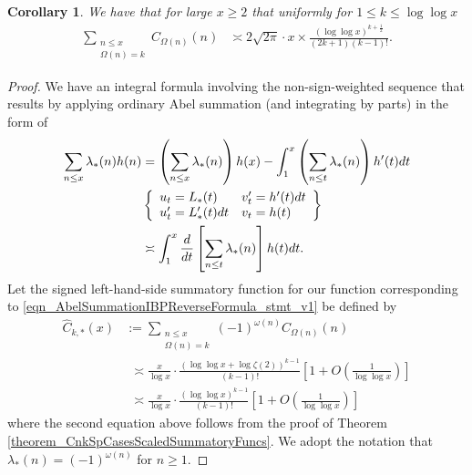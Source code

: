 \documentclass[11pt,reqno,a4letter]{article}
\numberwithin{figure}{section}
\numberwithin{table}{section}
\theoremstyle{plain}
\newtheorem{cor}[theorem]{Corollary}
\numberwithin{theorem}{section}
\theoremstyle{definition}
\begin{document}
\begin{cor} 
\label{cor_SummatoryFuncsOfUnsignedSeqs_v2} 
We have that for large $x \geq 2$ that uniformly for $1 \leq k \leq \log\log x$ 
\begin{align*} 
\sum_{\substack{n \leq x \\ \Omega(n) = k}} C_{\Omega(n)}(n) & \asymp 
     2\sqrt{2\pi} \cdot x \times 
     \frac{(\log\log x)^{k+\frac{1}{2}}}{(2k+1)(k-1)!}. 
\end{align*} 
\end{cor} 
\begin{proof} 
We have an integral formula involving the non-sign-weighted 
sequence that results by 
applying ordinary Abel summation (and integrating by parts) in the form of 
\begin{align} 
\label{eqn_AbelSummationIBPReverseFormula_stmt_v1} 
\sum_{n \leq x} \lambda_{\ast}(n) h(n) & = \left(\sum_{n \leq x} \lambda_{\ast}(n)\right) h(x) - 
     \int_{1}^{x} \left(\sum_{n \leq t} \lambda_{\ast}(n)\right) h^{\prime}(t) dt \\ 
\notag 
     & \left\{\begin{array}{ll} 
     u_t = L_{\ast}(t) & v_t^{\prime} = h^{\prime}(t) dt \\ 
     u_t^{\prime} = L_{\ast}^{\prime}(t) dt & v_t = h(t) 
     \end{array} 
     \right\} \\ 
     & \asymp 
     \int_1^{x} \frac{d}{dt}\left[\sum_{n \leq t} \lambda_{\ast}(n)\right] h(t) dt. 
\end{align} 
Let the signed left-hand-side summatory function for our function 
corresponding to \eqref{eqn_AbelSummationIBPReverseFormula_stmt_v1} be defined by 
\begin{align*} 
\widehat{C}_{k,\ast}(x) & := \sum_{\substack{n \leq x \\ \Omega(n)=k}} 
     (-1)^{\omega(n)} C_{\Omega(n)}(n) \\ 
     & \phantom{:} \asymp  
     \frac{x}{\log x} \cdot \frac{(\log\log x + \log\zeta(2))^{k-1}}{(k-1)!} \left[ 
     1 + O\left(\frac{1}{\log\log x}\right)\right] \\ 
     & \phantom{:} \asymp 
     \frac{x}{\log x} \cdot \frac{(\log\log x)^{k-1}}{(k-1)!} \left[ 
     1 + O\left(\frac{1}{\log\log x}\right)\right]
\end{align*} 
where the second equation above follows from the proof of 
Theorem \ref{theorem_CnkSpCasesScaledSummatoryFuncs}. 
We adopt the notation that $\lambda_{\ast}(n) = (-1)^{\omega(n)}$ for $n \geq 1$. 


\end{proof}
\end{document}
